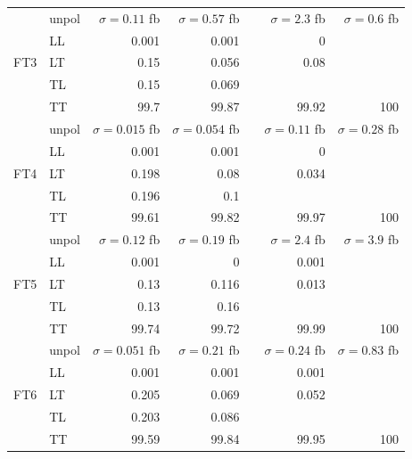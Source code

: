 \begin{table}[h]
{\begin{tabular}{llrrrrr}
\midrule
\multirow{5}{*}{FT3}
 & unpol & $\sigma = \num{0.11}$ fb & $\sigma = \num{0.57}$ fb &  & $\sigma = \num{2.3}$ fb & $\sigma = \num{0.6}$ fb \\
 & LL & \num{0.001} & \num{0.001} &  & \num{0} &  \\
 & LT & \num{0.15} & \num{0.056} &  & \num{0.08} &  \\
 & TL & \num{0.15} & \num{0.069} &  &  &  \\
 & TT & \num{99.7} & \num{99.87} &  & \num{99.92} & \num{100} \\
\midrule
\multirow{5}{*}{FT4}
 & unpol & $\sigma = \num{0.015}$ fb & $\sigma = \num{0.054}$ fb &  & $\sigma = \num{0.11}$ fb & $\sigma = \num{0.28}$ fb \\
 & LL & \num{0.001} & \num{0.001} &  & \num{0} &  \\
 & LT & \num{0.198} & \num{0.08} &  & \num{0.034} &  \\
 & TL & \num{0.196} & \num{0.1} &  &  &  \\
 & TT & \num{99.61} & \num{99.82} &  & \num{99.97} & \num{100} \\
\midrule
\multirow{5}{*}{FT5}
 & unpol & $\sigma = \num{0.12}$ fb & $\sigma = \num{0.19}$ fb &  & $\sigma = \num{2.4}$ fb & $\sigma = \num{3.9}$ fb \\
 & LL & \num{0.001} & \num{0} &  & \num{0.001} &  \\
 & LT & \num{0.13} & \num{0.116} &  & \num{0.013} &  \\
 & TL & \num{0.13} & \num{0.16} &  &  &  \\
 & TT & \num{99.74} & \num{99.72} &  & \num{99.99} & \num{100} \\
\midrule
\multirow{5}{*}{FT6}
 & unpol & $\sigma = \num{0.051}$ fb & $\sigma = \num{0.21}$ fb &  & $\sigma = \num{0.24}$ fb & $\sigma = \num{0.83}$ fb \\
 & LL & \num{0.001} & \num{0.001} &  & \num{0.001} &  \\
 & LT & \num{0.205} & \num{0.069} &  & \num{0.052} &  \\
 & TL & \num{0.203} & \num{0.086} &  &  &  \\
 & TT & \num{99.59} & \num{99.84} &  & \num{99.95} & \num{100} \\
\bottomrule
\end{tabular}
}%
\end{table}
\newpage
